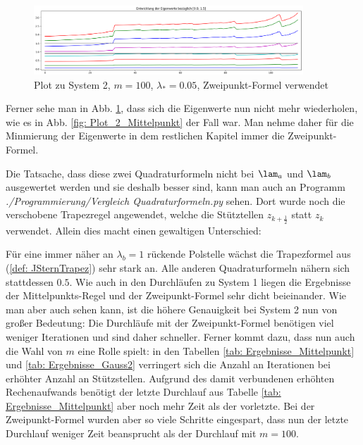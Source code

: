 \documentclass[a4paper,12pt]{report}
\newcommand{\1}{\mathds{1}}
\theoremstyle{plain} %
\theoremstyle{definition} %
\theoremstyle{remark}
\begin{document}
            \begin{figure}[h!t]
                  \centering
                  \includegraphics[width=0.9\textwidth, keepaspectratio]{./Gauss2/Plot_2_100_0.05.png}
                  \caption[Plot zu System 2, $m=100$, $\lambda_*=0.05$, Zweipunkt-Formel]{Plot zu System 2, $m=100$, $\lambda_*=0.05$, Zweipunkt-Formel verwendet}
                  \label{fig: Plot_2_150_0.05_Gauss2}
            \end{figure}

            Ferner sehe man in Abb. \ref{fig: Plot_2_150_0.05_Gauss2}, dass sich die Eigenwerte nun nicht mehr wiederholen, wie es in Abb. \ref{fig: Plot_2_Mittelpunkt} der Fall war.
            Man nehme daher für die Minmierung der Eigenwerte in dem restlichen Kapitel immer die Zweipunkt-Formel.

            Die Tatsache, dass diese zwei Quadraturformeln nicht bei $\lam_a$ und $\lam_b$ ausgewertet werden und sie deshalb besser sind, kann man auch an Programm
            \textit{./Programmierung/Vergleich Quadraturformeln.py} sehen. Dort wurde noch die verschobene Trapezregel angewendet, welche die Stütztellen $z_{k+\frac 1 2}$ statt $z_k$ verwendet.
            Allein dies macht einen gewaltigen Unterschied:

            Für eine immer näher an $\lambda_b = 1$ rückende Polstelle wächst die Trapezformel aus (\ref{def: JSternTrapez}) sehr stark an. Alle anderen Quadraturformeln nähern sich stattdessen $0.5$.
            Wie auch in den Durchläufen zu System 1 liegen die Ergebnisse der Mittelpunkts-Regel und der Zweipunkt-Formel sehr dicht beieinander.
            Wie man aber auch sehen kann, ist die höhere Genauigkeit bei System 2 nun von großer Bedeutung:
            Die Durchläufe mit der Zweipunkt-Formel benötigen viel weniger Iterationen und sind daher schneller.
            Ferner kommt dazu, dass nun auch die Wahl von $m$ eine Rolle spielt: in den Tabellen \ref{tab: Ergebnisse_Mittelpunkt} und \ref{tab: Ergebnisse_Gauss2} verringert sich die Anzahl an Iterationen bei erhöhter Anzahl an Stützstellen.
            Aufgrund des damit verbundenen erhöhten Rechenaufwands benötigt der letzte Durchlauf aus Tabelle \ref{tab: Ergebnisse_Mittelpunkt} aber noch mehr Zeit als der vorletzte.
            Bei der Zweipunkt-Formel wurden aber so viele Schritte eingespart, dass nun der letzte Durchlauf weniger Zeit beansprucht als der Durchlauf mit $m=100$.
\end{document}
